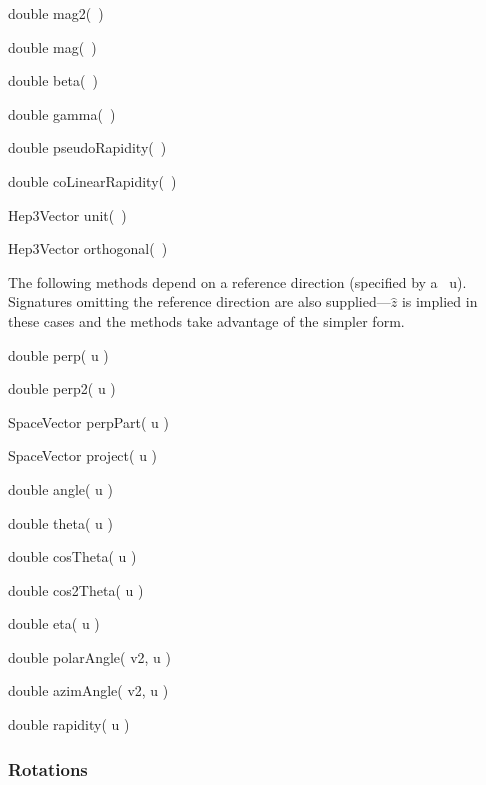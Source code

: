\begin{shortlist}
  \item double mag2(~) \see{\ref{eq:mag2}}
  \item double mag(~) \see{\ref{eq:mag}, \ref{eq:mag:2}}
  \item double beta(~) \see{\ref{eq:beta}}
  \item double gamma(~) \see{\ref{eq:gamma}}
  \item double pseudoRapidity(~) \see{\ref{eq:spherical}}
  \item double coLinearRapidity(~) \see{\ref{eq:coLinRap}}
  \item Hep3Vector unit(~) \see{\ref{eq:svunit}}
  \item Hep3Vector orthogonal(~) \see{\ref{eq:orthogonal}}
\end{shortlist}

\noindent
The following methods depend on a reference direction
(specified by a \SV\ u).  Signatures omitting
the reference direction are also supplied---$\hat{z}$ is implied in these
cases and the methods take advantage of the simpler form.

\begin{shortlist}
  \item double perp( u ) \see{\ref{eq:perp}}
  \item double perp2( u ) \see{\ref{eq:perp2}}
  \item SpaceVector perpPart( u ) \see{\ref{eq:perpPart}}
  \item SpaceVector project( u ) \see{\ref{eq:project}}
  \item double angle( u ) \see{\ref{eq:angle}}
  \item double theta( u ) \see{\ref{eq:theta}}
  \item double cosTheta( u ) \see{\ref{eq:cosTheta}}
  \item double cos2Theta( u ) \see{\ref{eq:cos2Theta}}
  \item double eta( u ) \see{\ref{eq:eta}, \ref{eq:eta:2}, \ref{eq:eta:3}, \ref{eq:eta:4}}
  \item double polarAngle( v2, u ) \see{\ref{eq:polarA}, \ref{eq:polarA:2}}
  \item double azimAngle( v2, u ) \see{\ref{eq:azim}, \ref{eq:azim:2}}
  \item double rapidity( u ) \see{\ref{eq:rap}, \ref{eq:rap:2}}
\end{shortlist}

\subsubsection{Rotations}

